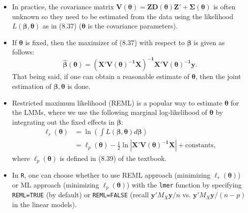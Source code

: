 \documentclass[ignorenonframetext,]{beamer}
\begin{document}
\begin{frame}[allowframebreaks]
\framebreak

\begin{itemize}
	\item In practice, the covariance matrix $\bm{V(\theta)=ZD(\theta)Z' + \Sigma(\theta)}$ is often unknown so they need to be estimated from the data using the likelihood $L(\bm{\beta, \theta})$ as in (8.37) ($\bm{\theta}$ is the covariance parameters).
	\item If $\bm{\theta}$ is fixed, then the maximizer of (8.37) with respect to $\bm{\beta}$ is given as follows:
$$
\bm{\hat{\beta}(\theta) = (X'V(\theta)^{-1}X)^{-1} X'V(\theta)^{-1}y}.
$$
That being said, if one can obtain a reasonable estimate of $\bm{\theta}$, then the joint estimation of $\bm{\beta, \theta}$ is done.
\end{itemize}

\framebreak
\begin{itemize}
	\item Restricted maximum likelihood (REML) is a popular way to estimate $\bm{\theta}$ for the LMMs, where we use the following marginal log-likelihood of $\bm{\theta}$ by integrating out the fixed effects in $\bm{\beta}$:
$$
\begin{aligned}
\ell_r(\bm{\theta})&= \ln  \left( \int L(\bm{\beta, \theta})d \bm{\beta} \right) \\
					&= \ell_p(\bm{\theta}) - \frac{1}{2} \ln |\bm{X'V(\theta)^{-1}X}| + \text{constants},
\end{aligned}
$$
where $\ell_p(\bm{\theta})$ is defined in (8.39) of the textbook.
\item In \texttt{R}, one can choose whether to use REML approach (minimizing $\ell_r(\bm{\theta})$) or ML approach (minimizing $\ell_p(\bm{\theta})$) with the \texttt{lmer} function by specifying \texttt{REML=TRUE} (by default) or \texttt{REML=FALSE} (recall $\bm{y}'M_X \bm{y} / n$ vs. $\bm{y}'M_X \bm{y} / (n-p)$ in the linear models).
\end{itemize}


\end{frame}


\end{document}
